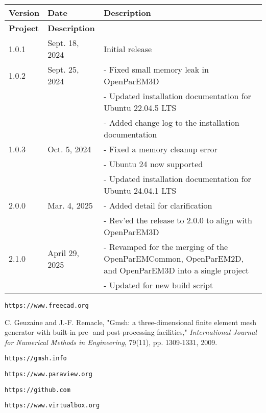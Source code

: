 \documentclass[titlepage]{article}
\renewcommand\_{\textunderscore\linebreak[1]}
\begin{document}
\tabcolsep=0.1cm
\small
\begin{longtable}[c]{|p{1.5cm}p{3cm}p{11cm}|}
    \hline
    \textbf{Version} & \textbf{Date} & Description \\
    \hline
    \endfirsthead
    \hline
    \textbf{Project} & \textbf{Description} \\
    \hline
    \endhead
   1.0.1 & Sept. 18, 2024 & Initial release \\
   1.0.2 & Sept. 25, 2024 & - Fixed small memory leak in OpenParEM3D \\
         &                & - Updated installation documentation for Ubuntu 22.04.5 LTS \\
         &                & - Added change log to the installation documentation \\
   1.0.3 & Oct. 5, 2024   & - Fixed a memory cleanup error \\
         &                & - Ubuntu 24 now supported \\
         &                & - Updated installation documentation for Ubuntu 24.04.1 LTS \\
   2.0.0 & Mar. 4, 2025   & - Added detail for clarification \\
         &                & - Rev'ed the release to 2.0.0 to align with OpenParEM3D \\
   2.1.0 & April 29, 2025   & - Revamped for the merging of the OpenParEMCommon, OpenParEM2D, and OpenParEM3D into a single project \\
         &                & - Updated for new build script \\
    \hline
\end{longtable}

\begin{thebibliography}{unsrt}

 \verb+https://www.freecad.org+

 C. Geuzaine and J.-F. Remacle, "Gmsh: a three-dimensional finite element mesh generator with built-in pre- and post-processing facilities," \textit{International Journal for Numerical Methods in Engineering}, 79(11), pp. 1309-1331, 2009.

 \verb+https://gmsh.info+

 \verb+https://www.paraview.org+

 \verb+https://github.com+

 \verb+https://www.virtualbox.org+

\end{thebibliography}
\end{document}
